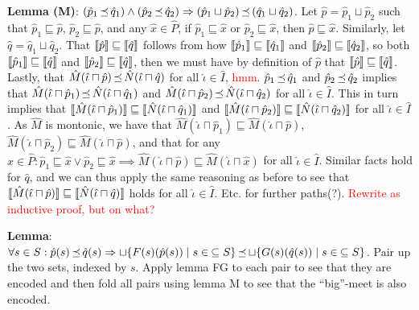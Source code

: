 
\textbf{Lemma (M)}: $(\hat p_{1} \operatorname{\mathrel{\preceq}} \hat q_{1}) \wedge (\hat p_{2} \operatorname{\mathrel{\preceq}} \hat q_{2}) \Rightarrow (\hat p_{1} \sqcup \hat p_{2}) \operatorname{\mathrel{\preceq}} \, (\hat q_{1} \sqcup \hat q_{2})$. Let $\hat p = \hat p_{1} \sqcup \hat p_{2}$ such that $\hat p_{1} \sqsubseteq \hat p$, $\hat p_{2} \sqsubseteq \hat p$, and any $\hat x \in \hat P$, if $\hat p_{1} \sqsubseteq \hat x$ or $\hat p_{2} \sqsubseteq \hat x$, then $\hat p \sqsubseteq \hat x$. Similarly, let $\hat q = \hat q_{1} \sqcup \hat q_{2}$. That $\llbracket\hat p\rrbracket \sqsubseteq \llbracket\hat q\rrbracket$ follows from how $\llbracket\hat p_{1}\rrbracket \sqsubseteq \llbracket\hat q_{1}\rrbracket$ and $\llbracket\hat p_{2}\rrbracket \sqsubseteq \llbracket\hat q_{2}\rrbracket$, so both $\llbracket\hat p_{1}\rrbracket \sqsubseteq \llbracket\hat q\rrbracket$ and $\llbracket\hat p_{2}\rrbracket \sqsubseteq \llbracket\hat q\rrbracket$, then we must have by definition of $\hat p$ that $\llbracket\hat p\rrbracket \sqsubseteq \llbracket\hat q\rrbracket$. Lastly, that $\hat M(\hat \iota \sqcap \hat p) \operatorname{\mathrel{\preceq}} \hat N(\hat \iota \sqcap \hat q)$ for all $\hat \iota \in \hat I$, \textcolor{red}{hmm}. $\hat p_{1} \operatorname{\mathrel{\preceq}} \hat q_{1}$ and $\hat p_{2} \operatorname{\mathrel{\preceq}} \hat q_{2}$ implies that $\hat M(\hat \iota \sqcap \hat p_{1}) \operatorname{\mathrel{\preceq}} \hat N(\hat \iota \sqcap \hat q_{1})$ and $\hat M(\hat \iota \sqcap \hat p_{2}) \operatorname{\mathrel{\preceq}} \hat N(\hat \iota \sqcap \hat q_{2})$ for all $\hat \iota \in \hat I$. This in turn implies that $\llbracket\hat M(\hat \iota \sqcap \hat p_{1})\rrbracket \sqsubseteq \llbracket\hat N(\hat \iota \sqcap \hat q_{1})\rrbracket$ and $\llbracket\hat M(\hat \iota \sqcap \hat p_{2})\rrbracket \sqsubseteq \llbracket\hat N(\hat \iota \sqcap \hat q_{2})\rrbracket$ for all $\hat \iota \in \hat I$. As $\hat M$ is montonic, we have that $\hat M(\hat \iota \sqcap \hat p_{1}) \sqsubseteq \hat M(\hat \iota \sqcap \hat p)$, $\hat M(\hat \iota \sqcap \hat p_{2}) \sqsubseteq \hat M(\hat \iota \sqcap \hat p)$, and that for any $\hat x \in \hat P : \hat p_{1} \sqsubseteq \hat x \vee \hat p_{2} \sqsubseteq \hat x \implies \hat M(\hat \iota \sqcap \hat p) \sqsubseteq \hat M(\hat \iota \sqcap \hat x)$ for all $\hat \iota \in \hat I$. Similar facts hold for $\hat q$, and we can thus apply the same reasoning as before to see that $\llbracket\hat M(\hat \iota \sqcap \hat p)\rrbracket \sqsubseteq \llbracket\hat N(\hat \iota \sqcap \hat q)\rrbracket$ holds for all $\hat \iota \in \hat I$. Etc. for further paths(?). \textcolor{red}{Rewrite as inductive proof, but on what?}

\textbf{Lemma}: $\forall s \in S : \hat p(s) \operatorname{\mathrel{\preceq}} \hat q(s) \Rightarrow \sqcup \{ F(s)(\hat p(s)) \mid s \in \: \subseteq S \} \operatorname{\mathrel{\preceq}} \sqcup \{ G(s)(\hat q(s)) \mid s \in \: \subseteq S \}$. Pair up the two sets, indexed by $s$. Apply lemma FG to each pair to see that they are encoded and then fold all pairs using lemma M to see that the ``big''-meet is also encoded.

